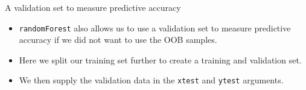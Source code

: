 \documentclass[
  10pt,
  ignorenonframetext,
]{beamer}
\newenvironment{Shaded}{}{}
\newcommand{\CommentTok}[1]{\textcolor[rgb]{0.00,0.50,0.00}{#1}}
\newcommand{\DecValTok}[1]{#1}
\newcommand{\FloatTok}[1]{#1}
\newcommand{\KeywordTok}[1]{\textcolor[rgb]{0.00,0.00,1.00}{#1}}
\newcommand{\NormalTok}[1]{#1}
\newcommand{\OperatorTok}[1]{#1}
\newcommand{\StringTok}[1]{\textcolor[rgb]{0.00,0.50,0.50}{#1}}
\providecommand{\tightlist}{%
  \setlength{\itemsep}{0pt}\setlength{\parskip}{0pt}}
\begin{document}
\begin{frame}[fragile]{A validation set to measure predictive accuracy}
\protect\hypertarget{a-validation-set-to-measure-predictive-accuracy}{}

\begin{itemize}
\tightlist
\item
  \texttt{randomForest} also allows us to use a validation set to
  measure predictive accuracy if we did not want to use the OOB samples.
\item
  Here we split our training set further to create a training and
  validation set.
\item
  We then supply the validation data in the \texttt{xtest} and
  \texttt{ytest} arguments.
\end{itemize}

\begin{Shaded}
\end{Shaded}

\end{frame}
\end{document}
